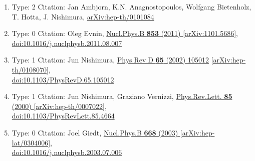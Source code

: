 \documentclass[a4paper,10pt]{article}
\begin{document}
\begin{enumerate}
\begin{enumerate}
  \item Type: 2 Citation: Jan Ambjorn, K.N. Anagnostopoulos, Wolfgang Bietenholz, T. Hotta, J. Nishimura, \href{https://arxiv.org/abs/hep-th/0101084}{arXiv:hep-th/0101084}
  \item Type: 0 Citation: Oleg Evnin, \href{https://www.doi.org/10.1016/j.nuclphysb.2011.08.007}{Nucl.Phys.B {\bf 853} (2011) }  \href{https://arxiv.org/abs/1101.5686}{[arXiv:1101.5686]},\\\href{https://www.doi.org/10.1016/j.nuclphysb.2011.08.007}{doi:10.1016/j.nuclphysb.2011.08.007}
  \item Type: 1 Citation: Jun Nishimura, \href{https://www.doi.org/10.1103/PhysRevD.65.105012}{Phys.Rev.D {\bf 65} (2002) 105012}  \href{https://arxiv.org/abs/hep-th/0108070}{[arXiv:hep-th/0108070]},\\\href{https://www.doi.org/10.1103/PhysRevD.65.105012}{doi:10.1103/PhysRevD.65.105012}
  \item Type: 1 Citation: Jun Nishimura, Graziano Vernizzi, \href{https://www.doi.org/10.1103/PhysRevLett.85.4664}{Phys.Rev.Lett. {\bf 85} (2000) }  \href{https://arxiv.org/abs/hep-th/0007022}{[arXiv:hep-th/0007022]},\\\href{https://www.doi.org/10.1103/PhysRevLett.85.4664}{doi:10.1103/PhysRevLett.85.4664}
  \item Type: 0 Citation: Joel Giedt, \href{https://www.doi.org/10.1016/j.nuclphysb.2003.07.006}{Nucl.Phys.B {\bf 668} (2003) }  \href{https://arxiv.org/abs/hep-lat/0304006}{[arXiv:hep-lat/0304006]},\\\href{https://www.doi.org/10.1016/j.nuclphysb.2003.07.006}{doi:10.1016/j.nuclphysb.2003.07.006}

\end{enumerate}
\end{enumerate}
\end{document}
